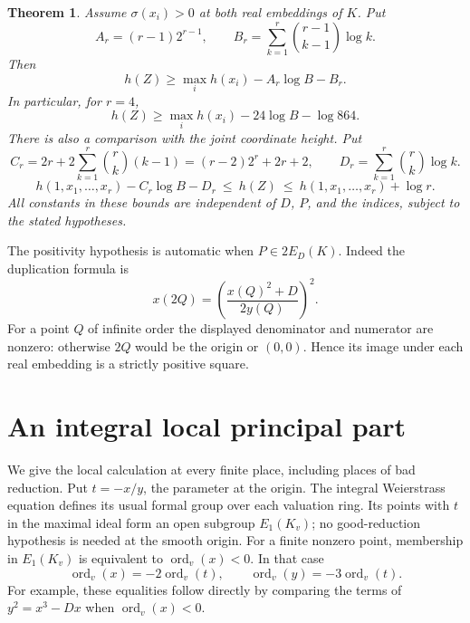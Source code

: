 \documentclass[11pt,a4paper]{article}
\newtheorem{theorem}{Theorem}
\newcommand{\ord}{\operatorname{ord}}
\begin{document}
\begin{theorem}\label{thm:main}
Assume $\sigma(x_i)>0$ at both real embeddings of $K$.
Put
\[
 A_r=(r-1)2^{r-1},\qquad
 B_r=\sum_{k=1}^r\binom{r-1}{k-1}\log k.
\]
Then
\begin{equation}\label{eq:individual-height}
 h(Z)\ge\max_i h(x_i)-A_r\log B-B_r.
\end{equation}
In particular, for $r=4$,
\begin{equation}\label{eq:four}
 h(Z)\ge \max_i h(x_i)-24\log B-\log864.
\end{equation}
There is also a comparison with the joint coordinate height.
Put
\[
 C_r=2r+2\sum_{k=1}^r\binom rk(k-1)
     =(r-2)2^r+2r+2,
 \qquad
 D_r=\sum_{k=1}^r\binom rk\log k.
\]
\begin{equation}\label{eq:height}
 h(1,x_1,\ldots,x_r)-C_r\log B-D_r
 \ \le\ h(Z)\ \le\ h(1,x_1,\ldots,x_r)+\log r.
\end{equation}
All constants in these bounds are independent of $D$, $P$,
and the indices, subject to the stated hypotheses.
\end{theorem}

The positivity hypothesis is automatic when $P\in2E_D(K)$.
Indeed the duplication formula is
\begin{equation}\label{eq:duplicate}
 x(2Q)=\left(\frac{x(Q)^2+D}{2y(Q)}\right)^2.
\end{equation}
For a point $Q$ of infinite order the displayed denominator
and numerator are nonzero: otherwise $2Q$ would be the origin
or $(0,0)$. Hence its image under each real embedding is a
strictly positive square.

\section{An integral local principal part}

We give the local calculation at every finite place, including
places of bad reduction. Put $t=-x/y$, the parameter at the
origin. The integral Weierstrass equation defines its usual
formal group over each valuation ring. Its points with
$t$ in the maximal ideal form an open subgroup $E_1(K_v)$;
no good-reduction hypothesis is needed at the smooth origin.
For a finite nonzero point, membership in $E_1(K_v)$ is
equivalent to $\ord_v(x)<0$. In that case
\begin{equation}\label{eq:valuations}
 \ord_v(x)=-2\ord_v(t),\qquad
 \ord_v(y)=-3\ord_v(t).
\end{equation}
For example, these equalities follow directly by comparing
the terms of $y^2=x^3-Dx$ when $\ord_v(x)<0$.
\end{document}
